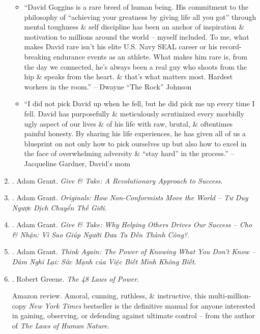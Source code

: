 \documentclass{article}
\begin{document}
\begin{enumerate}
\begin{itemize}
		\item ``{\sc David Goggins} is a rare breed of human being. His commitment to the philosophy of ``achieving your greatness by giving life all you got'' through mental toughness \& self discipline has been an anchor of inspiration \& motivation to millions around the world -- myself included. To me, what makes {\sc David} rare isn't his elite U.S. Navy SEAL career or his record-breaking endurance events as an athlete. What makes him rare is, from the day we connected, he's always been a real guy who shoots from the hip \& speaks from the heart. \& that's what matters most. Hardest workers in the room.'' -- {\sc Dwayne ``The Rock'' Johnson}
		\item ``I did not pick {\sc David} up when he fell, but he did pick me up every time I fell. {\sc David} has purposefully \& meticulously scrutinized every morbidly ugly aspect of our lives \& of his life with raw, brutal, \& oftentimes painful honesty. By sharing his life experiences, he has given all of us a blueprint on not only how to pick ourselves up but also how to excel in the face of overwhelming adversity \& ``stay hard'' in the process.'' -- {\sc Jacqueline Gardner, David}'s mom
	\end{itemize}
	
	\item \cite{Grant_give_take}. {\sc Adam Grant}. {\it Give \& Take: A Revolutionary Approach to Success}.\hfill{\sf[reading]}
	
	\item \cite{Grant2020}. Adam Grant. {\it Originals: How Non-Conformists Move the World -- Tư Duy Ngược Dịch Chuyển Thế Giới}.\hfill{\sf[done]}
	
	\item \cite{Grant_give_take_VN}. Adam Grant. {\it Give \& Take: Why Helping Others Drives Our Success -- Cho \& Nhận: Vì Sao Giúp Người Đưa Ta Đến Thành Công?}.\hfill{\sf[done]}
	
	\item \cite{Grant2022b}. Adam Grant. {\it Think Again: The Power of Knowing What You Don't Know -- Dám Nghĩ Lại: Sức Mạnh của Việc Biết Mình Không Biết}.\hfill{\sf[done]}
	
	\item \cite{Greene_laws_power}. {\sc Robert Greene}. {\it The 48 Laws of Power}. {}
	
	{\sf Amazon review.} Amoral, cunning, ruthless, \& instructive, this multi-million-copy {\it New York Times} bestseller is the definitive manual for anyone interested in gaining, observing, or defending against ultimate control -- from the author of {\it The Laws of Human Nature}.
	

\end{enumerate}
\end{document}
